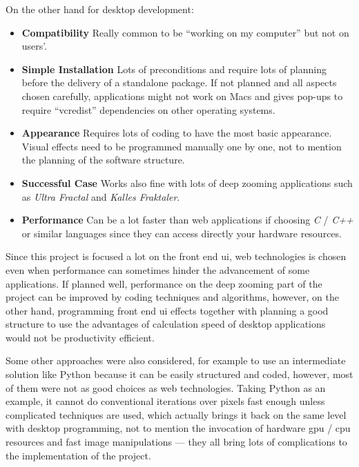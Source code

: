 On the other hand for desktop development:

\begin{itemize}
    \item \textbf{Compatibility} Really common to be ``working on my computer'' but not on users'.
    \item \textbf{Simple Installation} Lots of preconditions and require lots of planning before the delivery of a standalone package. If not planned and all aspects chosen carefully, applications might not work on Macs and gives pop-ups to require ``vcredist'' dependencies on other operating systems.
    \item \textbf{Appearance} Requires lots of coding to have the most basic appearance. Visual effects need to be programmed manually one by one, not to mention the planning of the software structure. 
    \item \textbf{Successful Case} Works also fine with lots of deep zooming applications such as \emph{Ultra Fractal} and \emph{Kalles Fraktaler}.
    \item \textbf{Performance} Can be a lot faster than web applications if choosing \emph{C} / \emph{C++} or similar languages since they can access directly your hardware resources.
\end{itemize}

Since this project is focused a lot on the front end \gls{ui}, web technologies is chosen even when performance can sometimes hinder the advancement of some applications. If planned well, performance on the deep zooming part of the project can be improved by coding techniques and algorithms, however, on the other hand, programming front end \gls{ui} effects together with planning a good structure to use the advantages of calculation speed of desktop applications would not be productivity efficient.


Some other approaches were also considered, for example to use an intermediate solution like Python because it can be easily structured and coded, however, most of them were not as good choices as web technologies. Taking Python as an example, it cannot do conventional iterations over pixels fast enough unless complicated techniques are used, which actually brings it back on the same level with desktop programming, not to mention the invocation of hardware \gls{gpu} / \gls{cpu} resources and fast image manipulations --- they all bring lots of complications to the implementation of the project.

